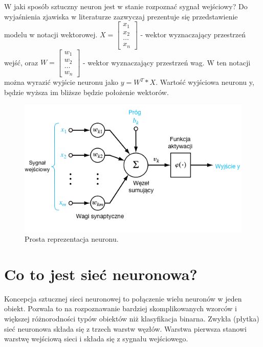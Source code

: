 \documentclass[12pt,a4paper,twoside,titlepage,openright]{book}
\begin{document}
W jaki sposób sztuczny neuron jest w stanie rozpoznać sygnał wejściowy? Do wyjaśnienia zjawiska w literaturze zazwyczaj prezentuje się przedstawienie modelu w notacji wektorowej.
\newline
\(X = \begin{bmatrix} x_{1} \\ x_{2} \\ \dots \\ x_{n} \end{bmatrix} \) - wektor wyznaczający przestrzeń wejść, oraz \newline
\(W = \begin{bmatrix} w_{1} \\ w_{2} \\ \dots \\ w_{n} \end{bmatrix} \) - wektor wyznaczający przestrzeń wag. \newline W ten notacji można wyrazić wyjście neuronu jako \(y= W^T * X\). Wartość wyjściowa neuronu y, będzie wyższa im bliższe będzie położenie wektorów.\cite{sieciNeuronowe}

\begin{figure}[ht]
	\centering
			\includegraphics[resolution=100, scale=0.7]{Neuron.png}
		\caption{Prosta reprezentacja neuronu.}
\end{figure}

\section{Co to jest sieć neuronowa?}
Koncepcja sztucznej sieci neuronowej to połączenie wielu neuronów w jeden obiekt. Pozwala to na rozpoznawanie bardziej skomplikowanych wzorców i większej różnorodności typów obiektów niż klasyfikacja binarna. Zwykła (płytka) sieć neuronowa składa się z trzech warstw węzłów. Warstwa pierwsza stanowi warstwę wejściową sieci i składa się z sygnału wejściowego.
\end{document}
